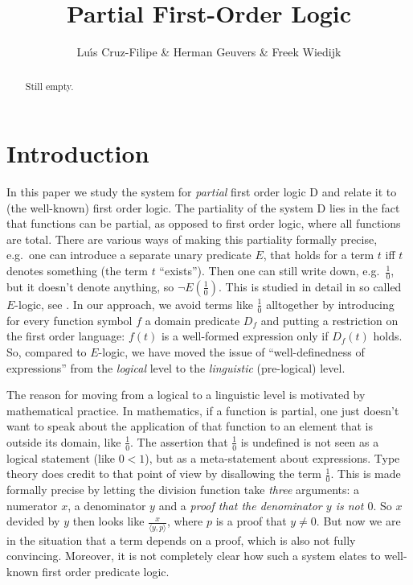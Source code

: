 \documentclass{article}
\newcommand{\D}{\textsf D}
\begin{document}
\title{Partial First-Order Logic}
\author{Lu\'\i s Cruz-Filipe \& Herman Geuvers \& Freek Wiedijk}
\maketitle

\begin{abstract}
Still empty.
\end{abstract}

\section{Introduction}
In this paper we study the system for {\em partial\/} first order
logic {\D} \cite{wie:zwa:03} and relate it to (the well-known) first
order logic. The partiality of the system {\D} lies in the fact that
functions can be partial, as opposed to first order logic, where all
functions are total. There are various ways of making this partiality
formally precise, e.g.\ one can introduce a separate unary predicate
$E$, that holds for a term $t$ iff $t$ denotes something (the term $t$
``exists''). Then one can still write down, e.g.\ $\frac{1}{0}$, but
it doesn't denote anything, so $\neg E(\frac{1}{0})$. This is studied
in detail in so called $E$-logic, see \cite{sco:79,bee:85}. In our approach,
we avoid terms like $\frac{1}{0}$ alltogether by introducing for every
function symbol $f$ a domain predicate $D_f$ and putting a restriction
on the first order language: $f(t)$ is a well-formed expression only
if $D_f(t)$ holds. So, compared to $E$-logic, we have moved the issue
of ``well-definedness of expressions'' from the {\em logical\/} level
to the {\em linguistic\/} (pre-logical) level.

The reason for moving from a logical to a linguistic level is
motivated by mathematical practice. In mathematics, if a function is
partial, one just doesn't want to speak about the application of that
function to an element that is outside its domain, like
$\frac{1}{0}$. The assertion that $\frac{1}{0}$ is undefined is not
seen as a logical statement (like $0<1$), but as a meta-statement
about expressions. Type theory does credit to that point of view by
disallowing the term $\frac{1}{0}$. This is made formally precise by
letting the division function take {\em three\/} arguments: a
numerator $x$, a denominator $y$ and a {\em proof that the denominator
$y$ is not $0$}. So $x$ devided by $y$ then looks like
$\frac{x}{\langle y, p\rangle}$, where $p$ is a proof that $y\neq
0$. But now we are in the situation that a term depends on a proof,
which is also not fully convincing. Moreover, it is not completely
clear how such a system elates to well-known first order predicate
logic.
\end{document}
